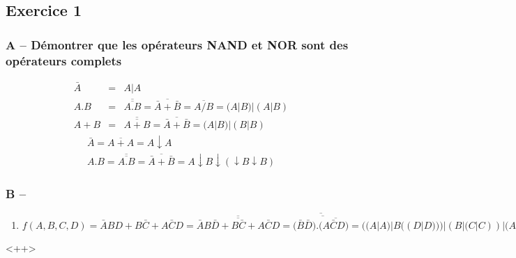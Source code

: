 \documentclass[12pt,a4paper,openany]{book}
\begin{document}
	\subsection{Exercice 1}
		\subsubsection{A -- Démontrer que les opérateurs NAND et NOR sont des opérateurs complets}
		\begin{eqnarray*}
			\bar A &=& A|A\\
			A.B &=& \overline{\overline{A.B}} = \overline{\bar A + \bar B} = \overline{A/B} = (A | B) | (A | B)\\
			A+B &=& \overline{\overline{A+B}} = \overline{\bar A + \bar B} = (A|B) |(B |B)
		\end{eqnarray*}
		\begin{eqnarray*}
			\bar A = \overline{A+A} = A \downarrow A\\
			A . B = \overline{\overline{A.B}} = \overline{\bar A+ \bar B} = A \downarrow B \downarrow (\downarrow B \downarrow B)
		\end{eqnarray*}
		\subsubsection{B --}
		\begin{enumerate}
			\item $f(A,B,C,D)=\bar A B D + B\bar C + A\bar C D= \overline{\overline{\bar A B \bar D + B \bar C + A \bar C D}} 
				= \overline{(\overline{\bar B\bar D).(\overline{A\bar C D)}}} = ( (A|A)|B( (D|D))) | (B|(C|C)) | (A|(C|C)|D)
				$

			
		\end{enumerate}<++>
\end{document}
